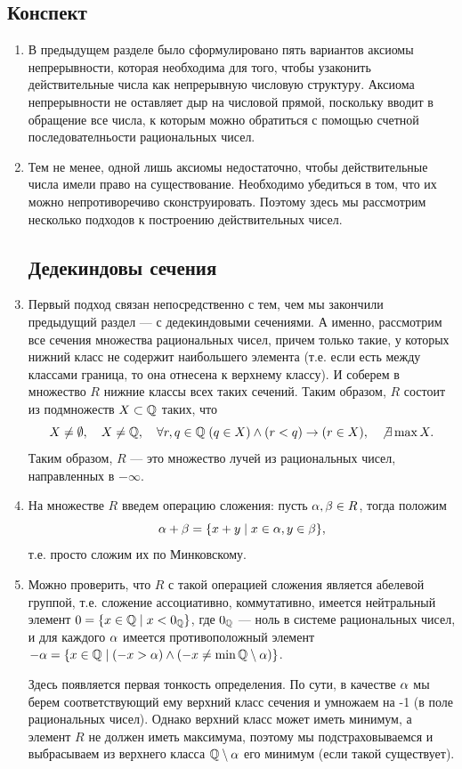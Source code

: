 \subsection*{Конспект}
\begin{enumerate}
\item В предыдущем разделе было сформулировано пять вариантов аксиомы непрерывности, которая необходима для того, чтобы узаконить действительные числа как непрерывную числовую структуру. Аксиома непрерывности не оставляет дыр на числовой прямой, поскольку вводит в обращение все числа, к которым можно обратиться с помощью счетной последователньости рациональных чисел.
\item Тем не менее, одной лишь аксиомы недостаточно, чтобы действительные числа имели право на существование. Необходимо убедиться в том, что их можно непротиворечиво сконструировать. Поэтому здесь мы рассмотрим несколько подходов к построению действительных чисел.

\subsection*{Дедекиндовы сечения}

\item Первый подход связан непосредственно с тем, чем мы закончили предыдущий раздел --- с дедекиндовыми сечениями. А именно, рассмотрим все сечения множества рациональных чисел, причем только такие, у которых нижний класс не содержит наибольшего элемента (т.е. если есть между классами граница, то она отнесена к верхнему классу). И соберем в множество $R$ нижние классы всех таких сечений. Таким образом, $R$ состоит из подмножеств $X\subset\mathbb Q$ таких, что
$$
X\ne\emptyset,\quad X\ne\mathbb Q,\quad\forall r,q\in\mathbb Q\;(q\in X)\land(r<q)\to(r\in X),\quad\not\exists\max X.
$$
Таким образом, $R$ --- это множество лучей из рациональных чисел, направленных в $-\infty$.
\item На множестве $R$ введем операцию сложения: пусть $\alpha,\beta\in R$, тогда положим
$$
\alpha+\beta = \{x+y\mid x\in \alpha,y\in \beta\},
$$
т.е. просто сложим их по Минковскому.
\item Можно проверить, что $R$ с такой операцией сложения является абелевой группой, т.е. сложение ассоциативно, коммутативно, имеется нейтральный элемент $0=\{x\in\mathbb Q\mid x<0_\mathbb Q\}$, где $0_\mathbb Q$ --- ноль в системе рациональных чисел, и для каждого $\alpha$ имеется противоположный элемент $-\alpha=\{x\in\mathbb Q\mid (-x>\alpha)\land (-x\ne\min\mathbb Q\setminus\alpha)\}$.

Здесь появляется первая тонкость определения. По сути, в качестве $\alpha$ мы берем соответствующий ему верхний класс сечения и умножаем на -1 (в поле рациональных чисел). Однако верхний класс может иметь минимум, а элемент $R$ не должен иметь максимума, поэтому мы подстраховываемся и выбрасываем из верхнего класса $\mathbb Q\setminus\alpha$ его минимум (если такой существует).


\end{enumerate}
